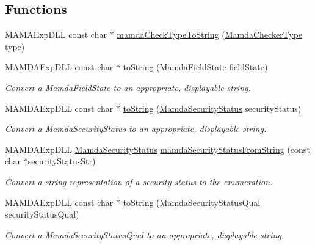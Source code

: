 \subsection*{Functions}
\begin{CompactItemize}
\item 
MAMAExp\-DLL const char $\ast$ \hyperlink{namespaceWombat_53e4b58601828a818a4fa789bf68c724}{mamda\-Check\-Type\-To\-String} (\hyperlink{namespaceWombat_f4416a38ea95baf743f07d19ac9b6a4a}{Mamda\-Checker\-Type} type)
\item 
MAMDAExp\-DLL const char $\ast$ \hyperlink{namespaceWombat_59b4d6cf9a01457bcb1d539cc26d3803}{to\-String} (\hyperlink{namespaceWombat_93aac974f2ab713554fd12a1fa3b7d2a}{Mamda\-Field\-State} field\-State)
\begin{CompactList}\small\item\em Convert a Mamda\-Field\-State to an appropriate, displayable string. \item\end{CompactList}\item 
MAMDAExp\-DLL const char $\ast$ \hyperlink{namespaceWombat_3f6d8c7884a574324c63379d915be1c3}{to\-String} (\hyperlink{namespaceWombat_073e683b7aeffa26cf3d2791dda32b4b}{Mamda\-Security\-Status} security\-Status)
\begin{CompactList}\small\item\em Convert a Mamda\-Security\-Status to an appropriate, displayable string. \item\end{CompactList}\item 
MAMDAExp\-DLL \hyperlink{namespaceWombat_073e683b7aeffa26cf3d2791dda32b4b}{Mamda\-Security\-Status} \hyperlink{namespaceWombat_6b90a072d040ebf093cb4d1c87218108}{mamda\-Security\-Status\-From\-String} (const char $\ast$security\-Status\-Str)
\begin{CompactList}\small\item\em Convert a string representation of a security status to the enumeration. \item\end{CompactList}\item 
MAMDAExp\-DLL const char $\ast$ \hyperlink{namespaceWombat_ed8e0ddb79a8024079f6996d5ad411e1}{to\-String} (\hyperlink{namespaceWombat_2de6f22c731ba94169dc24b8054862b8}{Mamda\-Security\-Status\-Qual} security\-Status\-Qual)
\begin{CompactList}\small\item\em Convert a Mamda\-Security\-Status\-Qual to an appropriate, displayable string. \item\end{CompactList}\item 

\end{CompactItemize}
